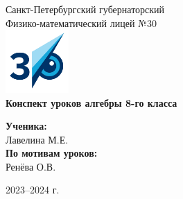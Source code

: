 \documentclass[12pt, a4paper]{report}
\theoremstyle{definition}
\theoremstyle{remark}
\begin{document}
	
	\begin{titlepage}
		\centering
		
		{\Large Санкт-Петербургский губернаторский\\ Физико-математический лицей №30}\\[1cm]
		\includegraphics[width=0.18\textwidth]{assets/logo.png}\\[5cm]
		
		\textbf{ \LARGE Конспект уроков алгебры 8-го класса}\\[2cm]
		
		\begin{flushright}
			\textbf{Ученика:} \\ Лавелина М.Е. \\[1cm]
			\textbf{По мотивам уроков:} \\ Ренёва О.В. \\[1cm]
		\end{flushright}
		
		\vfill
		
		{\large 2023--2024 г.}
		
	\end{titlepage}
	
		
	
	
	
\end{document}
